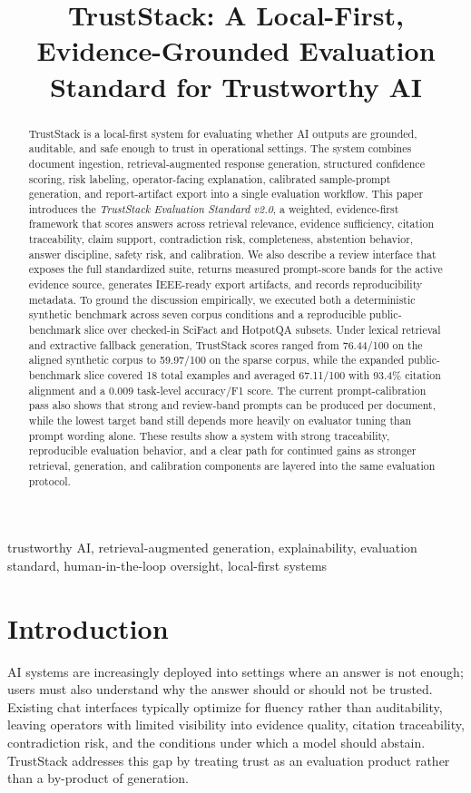 \documentclass[conference]{IEEEtran}
\title{TrustStack: A Local-First, Evidence-Grounded Evaluation Standard for Trustworthy AI}
\author{
\IEEEauthorblockN{Cordell Stonecipher}
\IEEEauthorblockA{TrustStack Research Project}
}
\newcommand{\TrustSection}[1]{\section{\texorpdfstring{\textcolor{TrustStackBlue}{#1}}{#1}}}
\begin{document}
\maketitle

\begin{abstract}
TrustStack is a local-first system for evaluating whether AI outputs are grounded, auditable, and safe enough to trust in operational settings. The system combines document ingestion, retrieval-augmented response generation, structured confidence scoring, risk labeling, operator-facing explanation, calibrated sample-prompt generation, and report-artifact export into a single evaluation workflow. This paper introduces the \emph{TrustStack Evaluation Standard v2.0}, a weighted, evidence-first framework that scores answers across retrieval relevance, evidence sufficiency, citation traceability, claim support, contradiction risk, completeness, abstention behavior, answer discipline, safety risk, and calibration. We also describe a review interface that exposes the full standardized suite, returns measured prompt-score bands for the active evidence source, generates IEEE-ready export artifacts, and records reproducibility metadata. To ground the discussion empirically, we executed both a deterministic synthetic benchmark across seven corpus conditions and a reproducible public-benchmark slice over checked-in SciFact and HotpotQA subsets. Under lexical retrieval and extractive fallback generation, TrustStack scores ranged from 76.44/100 on the aligned synthetic corpus to 59.97/100 on the sparse corpus, while the expanded public-benchmark slice covered 18 total examples and averaged 67.11/100 with 93.4\% citation alignment and a 0.009 task-level accuracy/F1 score. The current prompt-calibration pass also shows that strong and review-band prompts can be produced per document, while the lowest target band still depends more heavily on evaluator tuning than prompt wording alone. These results show a system with strong traceability, reproducible evaluation behavior, and a clear path for continued gains as stronger retrieval, generation, and calibration components are layered into the same evaluation protocol.
\end{abstract}

\begin{IEEEkeywords}
trustworthy AI, retrieval-augmented generation, explainability, evaluation standard, human-in-the-loop oversight, local-first systems
\end{IEEEkeywords}

\TrustSection{Introduction}
AI systems are increasingly deployed into settings where an answer is not enough; users must also understand why the answer should or should not be trusted. Existing chat interfaces typically optimize for fluency rather than auditability, leaving operators with limited visibility into evidence quality, citation traceability, contradiction risk, and the conditions under which a model should abstain. TrustStack addresses this gap by treating trust as an evaluation product rather than a by-product of generation.
\end{document}
